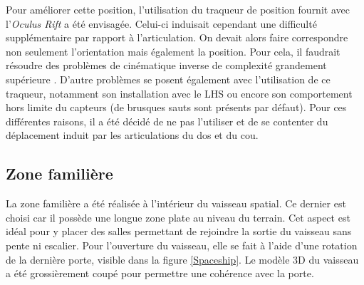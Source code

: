 		
		Pour améliorer cette position, l'utilisation du traqueur de position fournit avec l'\textit{Oculus Rift} a été envisagée. Celui-ci induisait cependant une difficulté supplémentaire par rapport à l'articulation. On devait alors faire correspondre non seulement l'orientation mais également la position. Pour cela, il faudrait résoudre des problèmes de cinématique inverse de complexité grandement supérieure \cite{wikipedia_cinematiqueInverse, Buss_InverseKinematicIntro}. D'autre problèmes se posent également avec l'utilisation de ce traqueur, notamment son installation avec le LHS ou encore son comportement hors limite du capteurs (de brusques sauts sont présents par défaut). Pour ces différentes raisons, il a été décidé de ne pas l'utiliser et de se contenter du déplacement induit par les articulations du dos et du cou.
		
	\subsection*{Zone familière}
		La zone familière a été réalisée à l'intérieur du vaisseau spatial. Ce dernier est choisi car il possède une longue zone plate au niveau du terrain. Cet aspect est idéal pour y placer des salles permettant de rejoindre la sortie du vaisseau sans pente ni escalier. Pour l'ouverture du vaisseau, elle se fait à l'aide d'une rotation de la dernière porte, visible dans la figure \ref{Spaceship}. Le modèle 3D du vaisseau a été grossièrement coupé pour permettre une cohérence avec la porte.
		\medskip
		
		\begin{minipage}{\linewidth}
			\label{Spaceship}
		\end{minipage}\medskip
		
